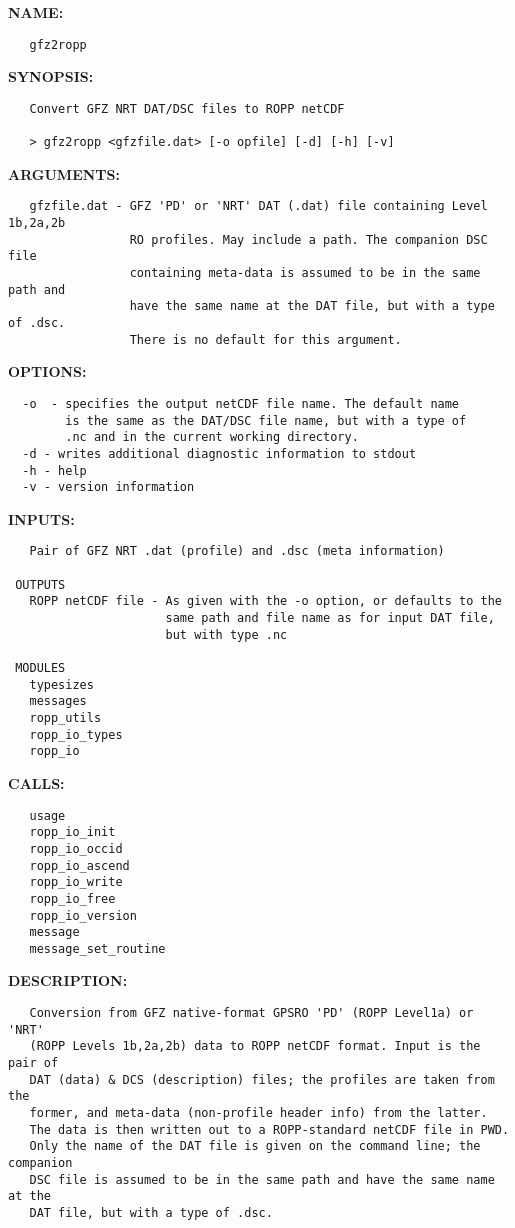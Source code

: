 \label{ch:robo84}
\label{ch:Programs_gfz2ropp}
\textbf{NAME:}\hspace{0.08in}\begin{Verbatim}
   gfz2ropp
\end{Verbatim}
\textbf{SYNOPSIS:}\hspace{0.08in}\begin{Verbatim}
   Convert GFZ NRT DAT/DSC files to ROPP netCDF

   > gfz2ropp <gfzfile.dat> [-o opfile] [-d] [-h] [-v]
\end{Verbatim}
\textbf{ARGUMENTS:}\hspace{0.08in}\begin{Verbatim}
   gfzfile.dat - GFZ 'PD' or 'NRT' DAT (.dat) file containing Level 1b,2a,2b
                 RO profiles. May include a path. The companion DSC file
                 containing meta-data is assumed to be in the same path and
                 have the same name at the DAT file, but with a type of .dsc.
                 There is no default for this argument.
\end{Verbatim}
\textbf{OPTIONS:}\hspace{0.08in}\begin{Verbatim}
  -o  - specifies the output netCDF file name. The default name
        is the same as the DAT/DSC file name, but with a type of
        .nc and in the current working directory.
  -d - writes additional diagnostic information to stdout
  -h - help
  -v - version information
\end{Verbatim}
\textbf{INPUTS:}\hspace{0.08in}\begin{Verbatim}
   Pair of GFZ NRT .dat (profile) and .dsc (meta information)

 OUTPUTS
   ROPP netCDF file - As given with the -o option, or defaults to the
                      same path and file name as for input DAT file,
                      but with type .nc

 MODULES
   typesizes
   messages
   ropp_utils
   ropp_io_types
   ropp_io
\end{Verbatim}
\textbf{CALLS:}\hspace{0.08in}\begin{Verbatim}
   usage
   ropp_io_init
   ropp_io_occid
   ropp_io_ascend
   ropp_io_write
   ropp_io_free
   ropp_io_version
   message
   message_set_routine
\end{Verbatim}
\textbf{DESCRIPTION:}\hspace{0.08in}\begin{Verbatim}
   Conversion from GFZ native-format GPSRO 'PD' (ROPP Level1a) or 'NRT'
   (ROPP Levels 1b,2a,2b) data to ROPP netCDF format. Input is the pair of
   DAT (data) & DCS (description) files; the profiles are taken from the
   former, and meta-data (non-profile header info) from the latter.
   The data is then written out to a ROPP-standard netCDF file in PWD.
   Only the name of the DAT file is given on the command line; the companion
   DSC file is assumed to be in the same path and have the same name at the
   DAT file, but with a type of .dsc.
\end{Verbatim}
